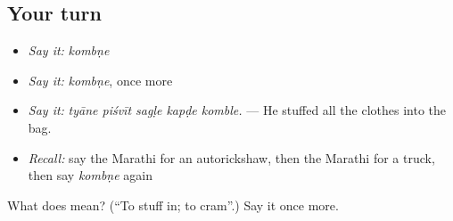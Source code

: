 \subsection*{Your turn}
\begin{itemize}
\raggedright
  \item \emph{Say it:} \emph{kombṇe}
  \item \emph{Say it:} \emph{kombṇe}, once more
  \item \emph{Say it:} \emph{tyāne piśvīt sagḷe kapḍe komble.} — He stuffed all the clothes into the bag.
  \item \emph{Recall:} say the Marathi for an autorickshaw, then the Marathi for a truck, then say \emph{kombṇe} again
\end{itemize}

\begin{tcolorbox}[breakable,colback=teal!4,colframe=teal!35!black,title={Before you move on}]
What does  mean? (\textquotedblleft{}To stuff in; to cram\textquotedblright{}.) Say it once more.
\end{tcolorbox}
